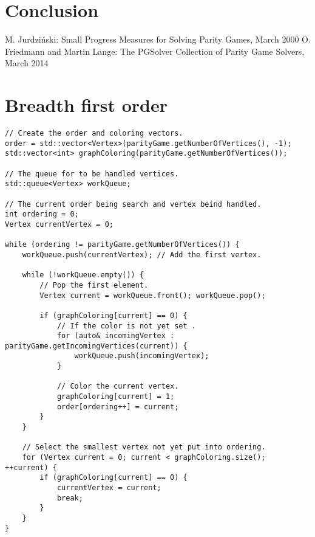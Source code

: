 \documentclass[10pt,a4paper]{article}
\begin{document}
\section{Conclusion}\label{conc}


\begin{thebibliography}{9}
 M. Jurdzi\'{n}ski: Small Progress Measures for Solving Parity Games, March 2000
 O. Friedmann and Martin Lange: The PGSolver Collection of Parity Game Solvers, March 2014
\end{thebibliography}


\newpage
\appendix

\section{Breadth first order}\label{appendix:bfs}

\begin{verbatim}
// Create the order and coloring vectors.
order = std::vector<Vertex>(parityGame.getNumberOfVertices(), -1);
std::vector<int> graphColoring(parityGame.getNumberOfVertices());

// The queue for to be handled vertices.
std::queue<Vertex> workQueue;

// The current order being search and vertex beind handled.
int ordering = 0;
Vertex currentVertex = 0;

while (ordering != parityGame.getNumberOfVertices()) {
	workQueue.push(currentVertex); // Add the first vertex.

    while (!workQueue.empty()) {
    	// Pop the first element.
        Vertex current = workQueue.front(); workQueue.pop();

        if (graphColoring[current] == 0) {
        	// If the color is not yet set .
            for (auto& incomingVertex : parityGame.getIncomingVertices(current)) {
            	workQueue.push(incomingVertex);
            }

            // Color the current vertex.
            graphColoring[current] = 1;
            order[ordering++] = current;
        }
    }

    // Select the smallest vertex not yet put into ordering.
    for (Vertex current = 0; current < graphColoring.size(); ++current) {
    	if (graphColoring[current] == 0) {
        	currentVertex = current;
            break;
        }
    }
}
\end{verbatim}
\end{document}
